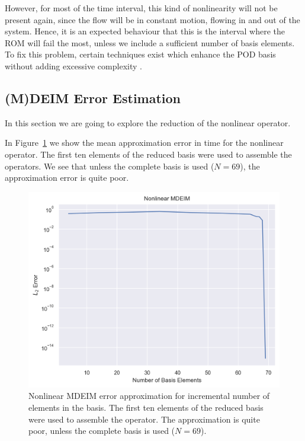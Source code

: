 \documentclass[../../thesis.tex]{subfiles}
\begin{document}
However, for most of the time interval, this kind of nonlinearity will not be present again,
since the flow will be in constant motion, flowing in and out of the system.
Hence, it is an expected behaviour that this is the interval where the ROM will fail the most,
unless we include a sufficient number of basis elements.
To fix this problem, certain techniques exist which enhance the POD basis 
without adding excessive complexity \cite{weightedPOD}.

\subsection{(M)DEIM Error Estimation}
In this section we are going to explore the reduction of the nonlinear operator.

In Figure~\ref{fig:mdeim_error_approximation} we show the mean approximation error
in time for the nonlinear operator. 
The first ten elements of the reduced basis were used to assemble the operators.
We see that unless the complete basis is used ($N=69$),
the approximation error is quite poor.
\begin{figure}[h]
    \centering
    \includegraphics[width=1\columnwidth]{research_project/piston/figures/mdeim_certification/nonlinear_error_decay.png}
    \caption{Nonlinear MDEIM error approximation for incremental number of elements in the basis.
    The first ten elements of the reduced basis were used to assemble the operator.
    The approximation is quite poor, unless the complete basis is used 
    ($N=69$).}
    \label{fig:mdeim_error_approximation}
\end{figure}
\end{document}
